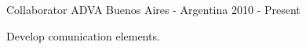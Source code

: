 

\begin{cventries}

  \cventry
    {Collaborator} %
    {ADVA} %
    {Buenos Aires - Argentina} %
    {2010 - Present} %
    {
      \begin{cvitems} %
        \item {Develop comunication elements.}
      \end{cvitems}
    }



\end{cventries}
